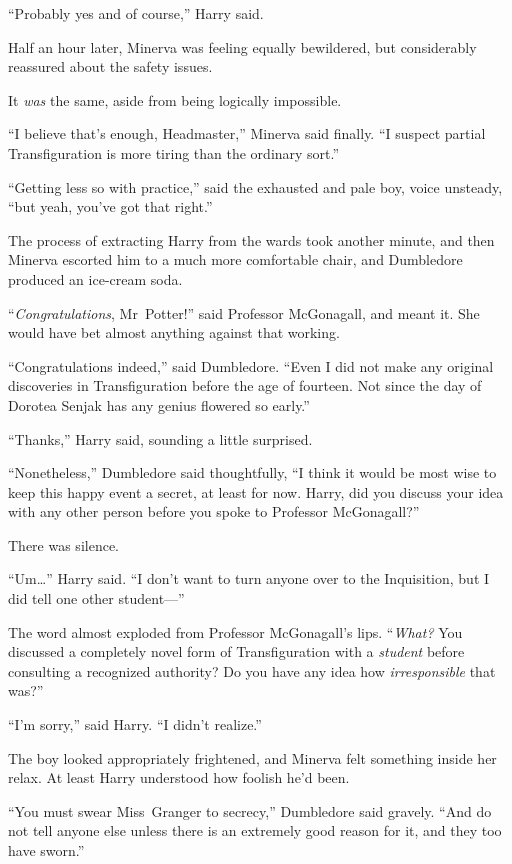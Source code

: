 “Probably yes and of course,” Harry said.

Half an hour later, Minerva was feeling equally bewildered, but considerably reassured about the safety issues.

It \emph{was} the same, aside from being logically impossible.

“I believe that’s enough, Headmaster,” Minerva said finally. “I suspect partial Transfiguration is more tiring than the ordinary sort.”

“Getting less so with practice,” said the exhausted and pale boy, voice unsteady, “but yeah, you’ve got that right.”

The process of extracting Harry from the wards took another minute, and then Minerva escorted him to a much more comfortable chair, and Dumbledore produced an ice-cream soda.

“\emph{Congratulations}, Mr~Potter!” said Professor McGonagall, and meant it. She would have bet almost anything against that working.

“Congratulations indeed,” said Dumbledore. “Even I did not make any original discoveries in Transfiguration before the age of fourteen. Not since the day of Dorotea Senjak has any genius flowered so early.”

“Thanks,” Harry said, sounding a little surprised.

“Nonetheless,” Dumbledore said thoughtfully, “I think it would be most wise to keep this happy event a secret, at least for now. Harry, did you discuss your idea with any other person before you spoke to Professor McGonagall?”

There was silence.

“Um…” Harry said. “I don’t want to turn anyone over to the Inquisition, but I did tell one other student—”

The word almost exploded from Professor McGonagall’s lips. “\emph{What?} You discussed a completely novel form of Transfiguration with a \emph{student} before consulting a recognized authority? Do you have any idea how \emph{irresponsible} that was?”

“I’m sorry,” said Harry. “I didn’t realize.”

The boy looked appropriately frightened, and Minerva felt something inside her relax. At least Harry understood how foolish he’d been.

“You must swear Miss~Granger to secrecy,” Dumbledore said gravely. “And do not tell anyone else unless there is an extremely good reason for it, and they too have sworn.”

